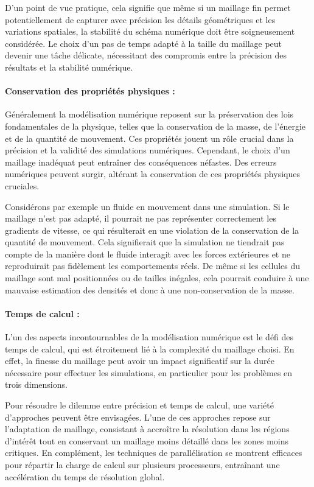 D'un point de vue pratique, cela signifie que même si un maillage fin permet potentiellement de capturer avec précision les détails géométriques et les variations spatiales, la stabilité du schéma numérique doit être soigneusement considérée. Le choix d'un pas de temps adapté à la taille du maillage peut devenir une tâche délicate, nécessitant des compromis entre la précision des résultats et la stabilité numérique.


\paragraph{Conservation des propriétés physiques :}

Généralement la modélisation numérique reposent sur la préservation des lois fondamentales de la physique, telles que la conservation de la masse, de l'énergie et de la quantité de mouvement. Ces propriétés jouent un rôle crucial dans la précision et la validité des simulations numériques. Cependant, le choix d'un maillage inadéquat peut entraîner des conséquences néfastes. Des erreurs numériques peuvent surgir, altérant la conservation de ces propriétés physiques cruciales.

Considérons par exemple un fluide en mouvement dans une simulation. Si le maillage n'est pas adapté, il pourrait ne pas représenter correctement les gradients de vitesse, ce qui résulterait en une violation de la conservation de la quantité de mouvement. Cela signifierait que la simulation ne tiendrait pas compte de la manière dont le fluide interagit avec les forces extérieures et ne reproduirait pas fidèlement les comportements réels. De même si les cellules du maillage sont mal positionnées ou de tailles inégales, cela pourrait conduire à une mauvaise estimation des densités et donc à une non-conservation de la masse.

\paragraph{Temps de calcul :}

L'un des aspects incontournables de la modélisation numérique est le défi des temps de calcul, qui est étroitement lié à la complexité du maillage choisi. En effet, la finesse du maillage peut avoir un impact significatif sur la durée nécessaire pour effectuer les simulations, en particulier pour les problèmes en trois dimensions.

Pour résoudre le dilemme entre précision et temps de calcul, une variété d'approches peuvent être envisagées. L'une de ces approches repose sur l'adaptation de maillage, consistant à accroître la résolution dans les régions d'intérêt tout en conservant un maillage moins détaillé dans les zones moins critiques. En complément, les techniques de parallélisation se montrent efficaces pour répartir la charge de calcul sur plusieurs processeurs, entraînant une accélération du temps de résolution global.

